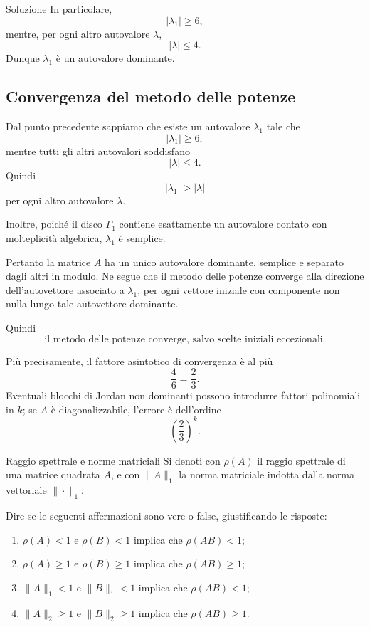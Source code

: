 \documentclass[a4paper]{article}
\begin{document}
\begin{snippetsolution}{Soluzione}
    In particolare,
    \[
        |\lambda_1|\geq 6,
    \]
    mentre, per ogni altro autovalore \(\lambda\),
    \[
        |\lambda|\leq 4.
    \]
    Dunque \(\lambda_1\) è un autovalore dominante.

    \subsection*{Convergenza del metodo delle potenze}

    Dal punto precedente sappiamo che esiste un autovalore \(\lambda_1\) tale che
    \[
        |\lambda_1|\geq 6,
    \]
    mentre tutti gli altri autovalori soddisfano
    \[
        |\lambda|\leq 4.
    \]
    Quindi
    \[
        |\lambda_1|>|\lambda|
    \]
    per ogni altro autovalore \(\lambda\).

    Inoltre, poiché il disco \(\Gamma_1\) contiene esattamente un autovalore contato con molteplicità algebrica, \(\lambda_1\) è semplice.

    Pertanto la matrice \(A\) ha un unico autovalore dominante, semplice e separato dagli altri in modulo. Ne segue che il metodo delle potenze converge alla direzione dell'autovettore associato a \(\lambda_1\), per ogni vettore iniziale con componente non nulla lungo tale autovettore dominante.

    Quindi
    \[
        \boxed{
            \text{il metodo delle potenze converge, salvo scelte iniziali eccezionali.}
        }
    \]

    Più precisamente, il fattore asintotico di convergenza è al più
    \[
        \frac{4}{6}=\frac{2}{3}.
    \]
    Eventuali blocchi di Jordan non dominanti possono introdurre fattori polinomiali in \(k\); se \(A\) è diagonalizzabile, l'errore è dell'ordine
    \[
        \boxed{
            \left(\frac{2}{3}\right)^k.
        }
    \]
\end{snippetsolution}

\begin{snippetexercise}{Raggio spettrale e norme matriciali}
    Si denoti con \(\rho(A)\) il raggio spettrale di una matrice quadrata \(A\), e con \(\|A\|_1\) la norma matriciale indotta dalla norma vettoriale \(\|\cdot\|_1\).

    Dire se le seguenti affermazioni sono vere o false, giustificando le risposte:
    \begin{enumerate}
        \item \(\rho(A)<1\) e \(\rho(B)<1\) implica che \(\rho(AB)<1\);
        \item \(\rho(A)\geq 1\) e \(\rho(B)\geq 1\) implica che \(\rho(AB)\geq 1\);
        \item \(\|A\|_1<1\) e \(\|B\|_1<1\) implica che \(\rho(AB)<1\);
        \item \(\|A\|_2\geq 1\) e \(\|B\|_2\geq 1\) implica che \(\rho(AB)\geq 1\).
    \end{enumerate}
\end{snippetexercise}
\end{document}
